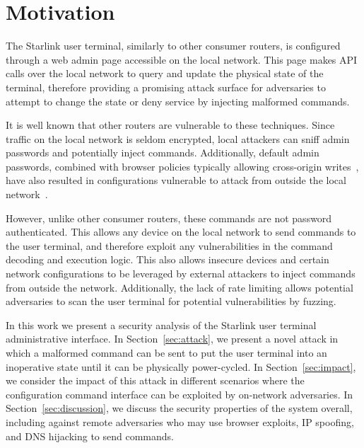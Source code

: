 \section{Motivation}\label{sec:motivation}

The Starlink user terminal, similarly to other consumer routers, is configured through a web admin page accessible on the local network.
This page makes API calls over the local network to query and update the physical state of the terminal, therefore providing a promising attack surface for adversaries to attempt to change the state or deny service by injecting malformed commands.

It is well known that other routers are vulnerable to these techniques.
Since traffic on the local network is seldom encrypted, local attackers can sniff admin passwords and potentially inject commands.
Additionally, default admin passwords, combined with browser policies typically allowing cross-origin writes~\cite{csrf_internal_network,same_origin_policy}, have also resulted in configurations vulnerable to attack from outside the local network~\cite{drive_by_pharming}.

However, unlike other consumer routers, these commands are not password authenticated.
This allows any device on the local network to send commands to the user terminal, and therefore exploit any vulnerabilities in the command decoding and execution logic.
This also allows insecure devices and certain network configurations to be leveraged by external attackers to inject commands from outside the network.
Additionally, the lack of rate limiting allows potential adversaries to scan the user terminal for potential vulnerabilities by fuzzing.

In this work we present a security analysis of the Starlink user terminal administrative interface.
In Section~\ref{sec:attack}, we present a novel attack in which a malformed command can be sent to put the user terminal into an inoperative state until it can be physically power-cycled.
In Section~\ref{sec:impact}, we consider the impact of this attack in different scenarios where the configuration command interface can be exploited by on-network adversaries.
In Section~\ref{sec:discussion}, we discuss the security properties of the system overall, including against remote adversaries who may use browser exploits, IP spoofing, and DNS hijacking to send commands.
